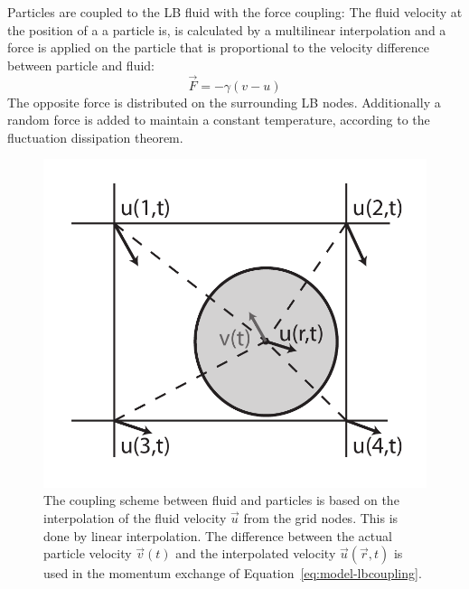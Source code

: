 Particles are coupled to the LB fluid with the force coupling:
The fluid velocity at the position of a a particle is, is calculated 
by a multilinear interpolation and a force is applied on the particle
that is proportional to the velocity difference between particle 
and fluid:
\begin{equation}
  \vec{F} = - \gamma \left(v-u\right) 
  \label{eq:model-lbcoupling}
\end{equation}
The opposite force is distributed on the surrounding LB nodes. Additionally
a random force is added to maintain a constant temperature, according
to the fluctuation dissipation theorem. 
\begin{figure}[htp]
\begin{center}
   \includegraphics[height=0.3\textheight]{../figs/latticeboltzmann-momentumexchange}
   \caption{The coupling scheme between fluid and particles is based on the
   interpolation of the fluid velocity $\vec{u}$ from the grid nodes.  
   This is done by linear interpolation. The difference between the
   actual particle velocity $\vec{v}(t)$ and the interpolated velocity
   $\vec{u}(\vec{r},t)$ is used in the momentum exchange of
   Equation~\ref{eq:model-lbcoupling}.}
  \label{fig:model-lbcoupling}
\end{center}
\end{figure}

